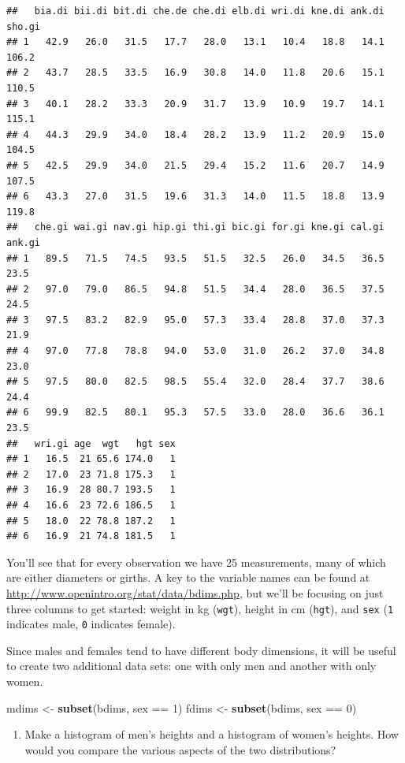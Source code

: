 \documentclass[]{article}
\newenvironment{Shaded}{\begin{snugshade}}{\end{snugshade}}
\newcommand{\KeywordTok}[1]{\textcolor[rgb]{0.13,0.29,0.53}{\textbf{{#1}}}}
\newcommand{\DecValTok}[1]{\textcolor[rgb]{0.00,0.00,0.81}{{#1}}}
\newcommand{\StringTok}[1]{\textcolor[rgb]{0.31,0.60,0.02}{{#1}}}
\newcommand{\NormalTok}[1]{{#1}}
\providecommand{\tightlist}{%
  \setlength{\itemsep}{0pt}\setlength{\parskip}{0pt}}
\begin{document}
\begin{verbatim}
##   bia.di bii.di bit.di che.de che.di elb.di wri.di kne.di ank.di sho.gi
## 1   42.9   26.0   31.5   17.7   28.0   13.1   10.4   18.8   14.1  106.2
## 2   43.7   28.5   33.5   16.9   30.8   14.0   11.8   20.6   15.1  110.5
## 3   40.1   28.2   33.3   20.9   31.7   13.9   10.9   19.7   14.1  115.1
## 4   44.3   29.9   34.0   18.4   28.2   13.9   11.2   20.9   15.0  104.5
## 5   42.5   29.9   34.0   21.5   29.4   15.2   11.6   20.7   14.9  107.5
## 6   43.3   27.0   31.5   19.6   31.3   14.0   11.5   18.8   13.9  119.8
##   che.gi wai.gi nav.gi hip.gi thi.gi bic.gi for.gi kne.gi cal.gi ank.gi
## 1   89.5   71.5   74.5   93.5   51.5   32.5   26.0   34.5   36.5   23.5
## 2   97.0   79.0   86.5   94.8   51.5   34.4   28.0   36.5   37.5   24.5
## 3   97.5   83.2   82.9   95.0   57.3   33.4   28.8   37.0   37.3   21.9
## 4   97.0   77.8   78.8   94.0   53.0   31.0   26.2   37.0   34.8   23.0
## 5   97.5   80.0   82.5   98.5   55.4   32.0   28.4   37.7   38.6   24.4
## 6   99.9   82.5   80.1   95.3   57.5   33.0   28.0   36.6   36.1   23.5
##   wri.gi age  wgt   hgt sex
## 1   16.5  21 65.6 174.0   1
## 2   17.0  23 71.8 175.3   1
## 3   16.9  28 80.7 193.5   1
## 4   16.6  23 72.6 186.5   1
## 5   18.0  22 78.8 187.2   1
## 6   16.9  21 74.8 181.5   1
\end{verbatim}

You'll see that for every observation we have 25 measurements, many of
which are either diameters or girths. A key to the variable names can be
found at \url{http://www.openintro.org/stat/data/bdims.php}, but we'll
be focusing on just three columns to get started: weight in kg
(\texttt{wgt}), height in cm (\texttt{hgt}), and \texttt{sex}
(\texttt{1} indicates male, \texttt{0} indicates female).

Since males and females tend to have different body dimensions, it will
be useful to create two additional data sets: one with only men and
another with only women.

\begin{Shaded}
\begin{Highlighting}[]
\NormalTok{mdims <-}\StringTok{ }\KeywordTok{subset}\NormalTok{(bdims, sex ==}\StringTok{ }\DecValTok{1}\NormalTok{)}
\NormalTok{fdims <-}\StringTok{ }\KeywordTok{subset}\NormalTok{(bdims, sex ==}\StringTok{ }\DecValTok{0}\NormalTok{)}
\end{Highlighting}
\end{Shaded}

\begin{enumerate}
\def\labelenumi{\arabic{enumi}.}
\tightlist
\item
  Make a histogram of men's heights and a histogram of women's heights.
  How would you compare the various aspects of the two distributions?
\end{enumerate}
\end{document}
